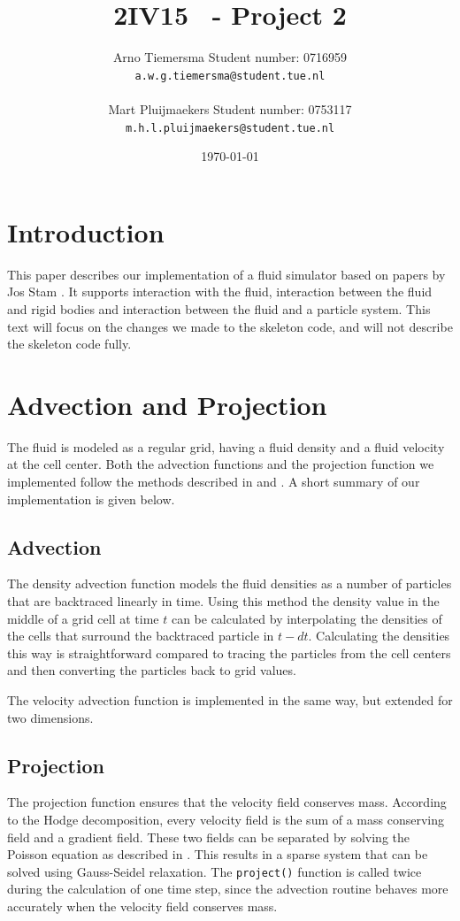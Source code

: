 \documentclass[a4paper,twoside,11pt,twocolumn]{article}
\title{\sffamily\bfseries 2IV15 \scg\ - Project 2}
\author{Arno Tiemersma \qquad Student number: 0716959 \\{\tt a.w.g.tiemersma@student.tue.nl}\\ \\Mart Pluijmaekers \qquad Student number: 0753117 \\{\tt m.h.l.pluijmaekers@student.tue.nl}}
\date{\today}
\begin{document}
\maketitle
\section{Introduction}
This paper describes our implementation of a fluid simulator based on papers by Jos Stam \cite{url:stam1, url:stam2}. It supports interaction with the fluid, interaction between the fluid and rigid bodies and interaction between the fluid and a particle system. This text will focus on the changes we made to the skeleton code, and will not describe the skeleton code fully.

\section{Advection and Projection}
The fluid is modeled as a regular grid, having a fluid density and a fluid velocity at the cell center. Both the advection functions and the projection function we implemented follow the methods described in \cite{url:stam1} and \cite{url:stam2}. A short summary of our implementation is given below.

\subsection{Advection}
The density advection function models the fluid densities as a number of particles that are backtraced linearly in time. Using this method the density value in the middle of a grid cell at time $t$ can be calculated by interpolating the densities of the cells that surround the backtraced particle in $t-dt$. Calculating the densities this way is straightforward compared to tracing the particles from the cell centers and then converting the particles back to grid values. 

The velocity advection function is implemented in the same way, but extended for two dimensions.

\subsection{Projection}
The projection function ensures that the velocity field conserves mass. According to the Hodge decomposition, every velocity field is the sum of a mass conserving field and a gradient field. These two fields can be separated by solving the Poisson equation as described in \cite{url:stam2}. This results in a sparse system that can be solved using Gauss-Seidel relaxation. The \texttt{project()} function is called twice during the calculation of one time step, since the advection routine behaves more accurately when the velocity field conserves mass. 
\end{document}
